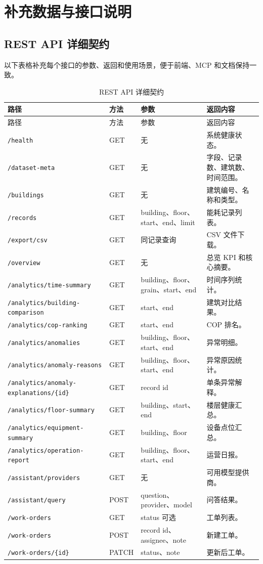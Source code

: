 \documentclass[12pt,a4paper]{ctexart}
\newcommand{\code}[1]{{\footnotesize\nolinkurl{#1}}}
\begin{document}
\clearpage
\section{补充数据与接口说明}
\subsection{REST API 详细契约}
以下表格补充每个接口的参数、返回和使用场景，便于前端、MCP 和文档保持一致。
\begin{longtable}{L{4.0cm}L{1.8cm}L{4.5cm}L{4.8cm}}
\caption{REST API 详细契约}\\
\toprule
路径 & 方法 & 参数 & 返回内容 \\
\midrule
\endfirsthead
\toprule
路径 & 方法 & 参数 & 返回内容 \\
\midrule
\endhead
\code{/health} & GET & 无 & 系统健康状态。 \\
\code{/dataset-meta} & GET & 无 & 字段、记录数、建筑数、时间范围。 \\
\code{/buildings} & GET & 无 & 建筑编号、名称和类型。 \\
\code{/records} & GET & building、floor、start、end、limit & 能耗记录列表。 \\
\code{/export/csv} & GET & 同记录查询 & CSV 文件下载。 \\
\code{/overview} & GET & 无 & 总览 KPI 和核心摘要。 \\
\code{/analytics/time-summary} & GET & building、floor、grain、start、end & 时间序列统计。 \\
\code{/analytics/building-comparison} & GET & start、end & 建筑对比结果。 \\
\code{/analytics/cop-ranking} & GET & start、end & COP 排名。 \\
\code{/analytics/anomalies} & GET & building、floor、start、end & 异常明细。 \\
\code{/analytics/anomaly-reasons} & GET & building、floor、start、end & 异常原因统计。 \\
\code{/analytics/anomaly-explanations/\{id\}} & GET & record id & 单条异常解释。 \\
\code{/analytics/floor-summary} & GET & building、start、end & 楼层健康汇总。 \\
\code{/analytics/equipment-summary} & GET & building、floor & 设备点位汇总。 \\
\code{/analytics/operation-report} & GET & building、floor、start、end & 运营日报。 \\
\code{/assistant/providers} & GET & 无 & 可用模型提供商。 \\
\code{/assistant/query} & POST & question、provider、model & 问答结果。 \\
\code{/work-orders} & GET & status 可选 & 工单列表。 \\
\code{/work-orders} & POST & record id、assignee、note & 新建工单。 \\
\code{/work-orders/\{id\}} & PATCH & status、note & 更新后工单。 \\
\bottomrule
\end{longtable}
\end{document}
